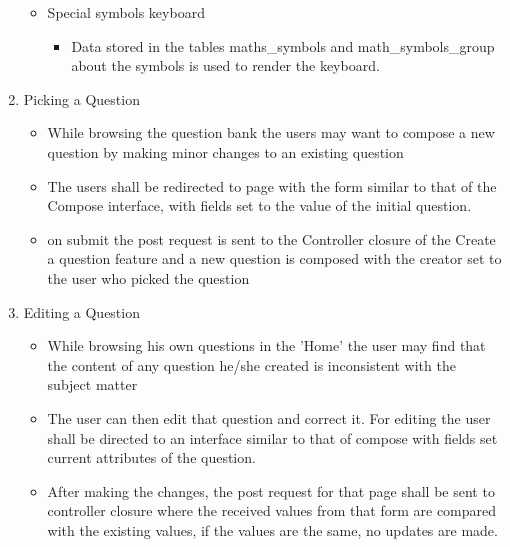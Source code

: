 \documentclass[a4paper,12pt,oneside]{book}
\begin{document}
\begin{enumerate}
\begin{itemize}
            \item Special symbols keyboard
                \begin{itemize}
                    \item Data stored in the tables maths\_symbols and math\_symbols\_group about the symbols is used to render the keyboard.
                \end{itemize}
            \end{itemize}
            
            
        \item Picking a Question 
            \begin{itemize}
              \item While browsing the question bank the users may want to compose a new question by making minor changes to an existing question
              
              \item The users shall be redirected to page with the form similar to that of the Compose interface, with fields set to the value of the initial question.
              
              \item on submit the post request is sent to the Controller closure of the Create a question feature and a new question is composed with the creator set to the user who picked the question
            \end{itemize}
            
         \newpage \item Editing a Question 
            \begin{itemize}
              \item While browsing his own questions in the 'Home' the user may find that the content of any question he/she created is inconsistent with the subject matter
              
              \item The user can then edit that question and correct it. For editing the user shall be directed to an interface similar to that of compose with fields set current attributes of the question.
              
              \item After making the changes, the post request for that page shall be sent to controller closure where the received values from that form are compared with the existing values, if the values are the same, no updates are made.
            \end{itemize}
            

\end{enumerate}
\end{document}
